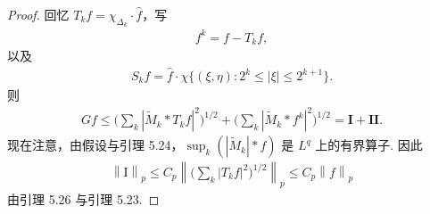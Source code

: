\begin{proof}
回忆 $T_{k}f = \chi_{\Delta_{k}}\cdot\widehat{f}$，写
\begin{align*}
  f^{k}=f-T_{k}f,
\end{align*}
以及
\begin{align*}
  S_{k}f=\widehat{f}\cdot\chi\{(\xi,\eta):2^{k}\leq|\xi|\leq 2^{k+1}\}.
\end{align*}
则
\begin{align*}
  G f\leq\Big(\sum_{k}|\widetilde{M}_{k}*T_{k}f|^{2}\Big)^{1/2}
  +\Big(\sum_{k}|\widetilde{M}_{k}*f^{k}|^{2}\Big)^{1/2}=\mathbf{I}+\mathbf{II}.
\end{align*}
现在注意，由假设与引理 5.24，$\sup_k(|\widetilde{M}_k|*f)$ 是 $L^q$ 上的有界算子. 因此
\begin{align*}
  \left\|\mathrm{I}\right\|_{p}\leq C_{p}\left\|\Big(\sum_{k}\left|T_{k}f\right|^{2}\Big)^{1/2}\right\|_{p}\leq C_{p}\left\|f\right\|_{p}
\end{align*}
由引理 5.26 与引理 5.23.


\end{proof}
